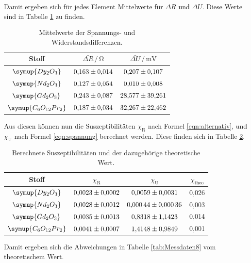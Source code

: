 Damit ergeben sich für jedes Element Mittelwerte für $\Delta R$ und $\Delta U$. 
Diese Werte sind in Tabelle \ref{tab:Mittelwerte} zu finden.

\begin{table}
\centering
\caption{Mittelwerte der Spannungs- und Widerstandsdifferenzen.}
\label{tab:Mittelwerte}
\begin{tabular}{c c c}
\toprule
Stoff & $\bar{\Delta R} \,/\, \si{\ohm}$ & $\bar{\Delta U} \,/\, \si{\milli\volt}$\\
\midrule
$\symup{Dy_2O_3}$ & $\num{0.163+-0.014}$ & $\num{0.207+-0.107}$\\
$\symup{Nd_2O_3}$ & $\num{0.127+-0.054}$ & $\num{0.010+-0.008}$\\
$\symup{Gd_2O_3}$ & $\num{0.243+-0.087}$ & $\num{28.577+-39.261}$\\
$\symup{C_6O_\text{12}Pr_2}$ & $\num{0.187+-0.034}$ & $\num{32.267+-22.462}$\\
\bottomrule
\end{tabular}
\end{table}


Aus diesen können nun die Suszeptibilitäten $\chi_\text{R}$ nach Formel \eqref{eqn:alternativ},
und $\chi_\text{U}$ nach Formel \eqref{eqn:spannung} berechnet werden.
Diese finden sich in Tabelle \ref{tab:Mittelwerte2}.  

\begin{table}
\centering
\caption{Berechnete Suszeptibilitäten und der dazugehörige theoretische Wert.}
\label{tab:Mittelwerte2}
\begin{tabular}{c c c c}
\toprule
Stoff & $\chi_\text{R}$ & $\chi_\text{U}$ & $\chi_\text{theo}$\\
\midrule
$\symup{Dy_2O_3}$ & $\num{0.0023+-0.0002}$ & $\num{0.0059+-0.0031}$ & 0,026\\
$\symup{Nd_2O_3}$ & $\num{0.0028+-0.0012}$ & $\num{0.00044+-0.00036}$ & 0,003 \\
$\symup{Gd_2O_3}$ & $\num{0.0035+-0.0013}$ & $\num{0.8318+-1.1423}$ & 0,014\\
$\symup{C_6O_\text{12}Pr_2}$ & $\num{0.0041+-0.0007}$ & $\num{1.4148+-0.9849}$ & 0,001 \\
\bottomrule
\end{tabular}
\end{table}

Damit ergeben sich die Abweichungen in Tabelle \ref{tab:Messdaten8} vom theoretischem 
Wert. 

